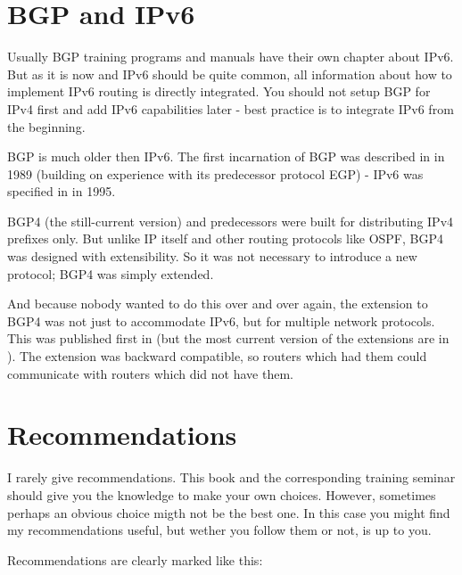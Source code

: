 \section{BGP and IPv6}
Usually BGP training programs and manuals have their own chapter about IPv6. But as it is now  and IPv6 should be quite common, all information about how to implement IPv6 routing is directly integrated. You should not setup BGP for IPv4 first and add IPv6 capabilities later - best practice is to integrate IPv6 from the beginning.

BGP is much older then IPv6. The first incarnation of BGP was described in  in 1989 (building on experience with its predecessor protocol \gls{EGP}) - IPv6 was specified in  in 1995.

BGP4 (the still-current version) and predecessors were built for distributing IPv4 prefixes only. But unlike IP itself and other routing protocols like \gls{OSPF}, BGP4 was designed with extensibility. So it was not necessary to introduce a new protocol; BGP4 was simply extended.

And because nobody wanted to do this over and over again, the extension to BGP4 was not just to accommodate IPv6, but for multiple network protocols. This was published first in  (but the most current version of the extensions are in ). The extension was backward compatible, so routers which had them could communicate with routers which did not have them.

\section{Recommendations}
I rarely give recommendations. This book and the corresponding training seminar should give you the knowledge to make your own choices. However, sometimes perhaps an obvious choice migth not be the best one. In this case you might find my recommendations useful, but wether you follow them or not, is up to you.

Recommendations are clearly marked like this:

